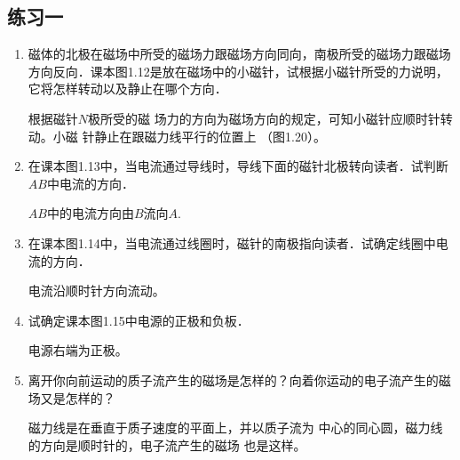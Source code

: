 \subsection{练习一}
\begin{enumerate}
    \item 磁体的北极在磁场中所受的磁场力跟磁场方向同向，南极所受的磁场力跟磁场方向反向．课本图1.12是放在磁场中的小磁针，试根据小磁针所受的力说明，它将怎样转动以及静止在哪个方向．
\begin{figure}[htp]
\centering
{}
\caption{}
\end{figure}




\begin{solution}
    根据磁针$N$极所受的磁
    场力的方向为磁场方向的规定，可知小磁针应顺时针转动。小磁
    针静止在跟磁力线平行的位置上
    （图1.20）。
\end{solution}

    \item 在课本图1.13中，当电流通过导线时，导线下面的磁针北极转向读者．试判断$AB$中电流的方向．


    \begin{solution}
        $AB$中的电流方向由$B$流向$A$.
    \end{solution}
    
    \item 在课本图1.14中，当电流通过线圈时，磁针的南极指向读者．试确定线圈中电流的方向．


    \begin{solution}
        电流沿顺时针方向流动。
    \end{solution}
 

    \item 试确定课本图1.15中电源的正极和负板．


    \begin{solution}
        电源右端为正极。
    \end{solution}
    
    \item 离开你向前运动的质子流产生的磁场是怎样的？向着你运动的电子流产生的磁场又是怎样的？


    \begin{solution}
        磁力线是在垂直于质子速度的平面上，并以质子流为
        中心的同心圆，磁力线的方向是顺时针的，电子流产生的磁场
        也是这样。
    \end{solution}
    
\end{enumerate}




